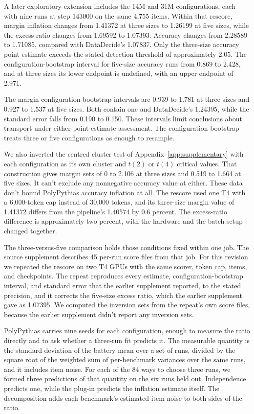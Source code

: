 A later exploratory extension includes the 14M and 31M configurations, each with nine runs at step 143000 on the same 4,755 items. Within that rescore, margin inflation changes from 1.41372 at three sizes to 1.26199 at five sizes, while the excess ratio changes from 1.69592 to 1.07393. Accuracy changes from 2.28589 to 1.71085, compared with DataDecide's 1.07837. Only the three-size accuracy point estimate exceeds the stated detection threshold of approximately 2.05. The configuration-bootstrap interval for five-size accuracy runs from 0.869 to 2.428, and at three sizes its lower endpoint is undefined, with an upper endpoint of 2.971.

The margin configuration-bootstrap intervals are 0.939 to 1.781 at three sizes and 0.927 to 1.537 at five sizes. Both contain one and DataDecide's 1.24395, while the standard error falls from 0.190 to 0.150. These intervals limit conclusions about transport under either point-estimate assessment. The configuration bootstrap treats three or five configurations as enough to resample.

We also inverted the centred cluster test of Appendix~\ref{app:supplementary} with each configuration as its own cluster and $t(2)$ or $t(4)$ critical values. That construction gives margin sets of 0 to 2.106 at three sizes and 0.519 to 1.664 at five sizes. It can't exclude any nonnegative accuracy value at either. These data don't bound PolyPythias accuracy inflation at all. The rescore used one T4 with a 6,000-token cap instead of 30,000 tokens, and its three-size margin value of 1.41372 differs from the pipeline's 1.40574 by 0.6 percent. The excess-ratio difference is approximately two percent, with the hardware and the batch setup changed together.

The three-versus-five comparison holds those conditions fixed within one job. The source supplement describes 45 per-run score files from that job. For this revision we repeated the rescore on two T4 GPUs with the same scorer, token cap, items, and checkpoints. The repeat reproduces every estimate, configuration-bootstrap interval, and standard error that the earlier supplement reported, to the stated precision, and it corrects the five-size excess ratio, which the earlier supplement gave as 1.07395. We computed the inversion sets from the repeat's own score files, because the earlier supplement didn't report any inversion sets.

PolyPythias carries nine seeds for each configuration, enough to measure the ratio directly and to ask whether a three-run fit predicts it. The measurable quantity is the standard deviation of the battery mean over a set of runs, divided by the square root of the weighted sum of per-benchmark variances over the same runs, and it includes item noise. For each of the 84 ways to choose three runs, we formed three predictions of that quantity on the six runs held out. Independence predicts one, while the plug-in predicts the inflation estimate itself. The decomposition adds each benchmark's estimated item noise to both sides of the ratio.

